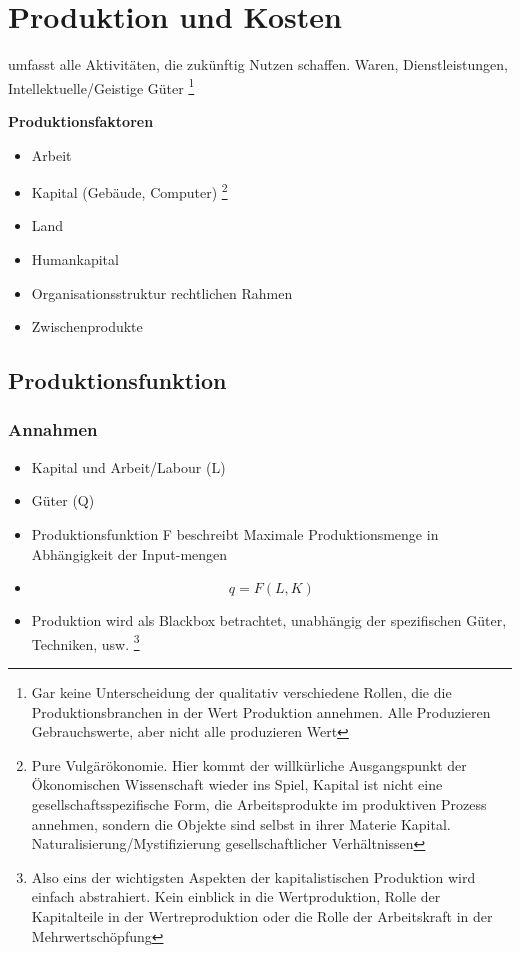 \section{Produktion und Kosten}

\begin{definition}
    [Produktion] umfasst alle Aktivitäten, die zukünftig Nutzen schaffen. Waren, Dienstleistungen, Intellektuelle/Geistige Güter \footnote{Gar keine Unterscheidung der qualitativ verschiedene Rollen, die die Produktionsbranchen in der Wert Produktion annehmen. Alle Produzieren Gebrauchswerte, aber nicht alle produzieren Wert}
\end{definition}
\textbf{Produktionsfaktoren}
\begin{itemize}
    \item Arbeit
    \item Kapital (Gebäude, Computer) \footnote{Pure Vulgärökonomie. Hier kommt der willkürliche Ausgangspunkt der Ökonomischen Wissenschaft wieder ins Spiel, Kapital ist nicht eine gesellschaftsspezifische Form, die Arbeitsprodukte im produktiven Prozess annehmen, sondern die Objekte sind selbst in ihrer Materie Kapital. Naturalisierung/Mystifizierung gesellschaftlicher Verhältnissen}
    \item Land
    \item Humankapital 
    \item Organisationsstruktur rechtlichen Rahmen
    \item Zwischenprodukte
\end{itemize}

\subsection{Produktionsfunktion}
\subsubsection{Annahmen}
\begin{itemize}
    \item Kapital und Arbeit/Labour (L)
    \item Güter (Q)
    \item Produktionsfunktion F beschreibt Maximale Produktionsmenge in Abhängigkeit der Input-mengen
    \item \begin{equation}
        q = F(L,K)
    \end{equation}
    \item Produktion wird als Blackbox betrachtet, unabhängig der spezifischen Güter, Techniken, usw. \footnote{Also eins der wichtigsten Aspekten der kapitalistischen Produktion wird einfach abstrahiert. Kein einblick in die Wertproduktion, Rolle der Kapitalteile in der Wertreproduktion oder die Rolle der Arbeitskraft in der Mehrwertschöpfung}
\end{itemize}
